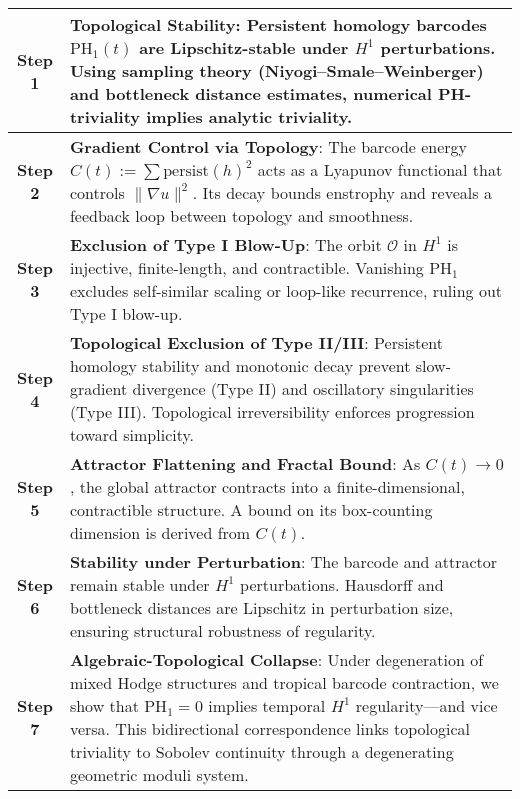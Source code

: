 \documentclass[11pt]{article}
\theoremstyle{definition}
\begin{document}
\begin{center}
\renewcommand{\arraystretch}{1.4}
\begin{tabular}{|c|p{12.5cm}|}
\hline
\textbf{Step 1} & \textbf{Topological Stability}: Persistent homology barcodes $\mathrm{PH}_1(t)$ are Lipschitz-stable under $H^1$ perturbations. Using sampling theory (Niyogi--Smale--Weinberger) and bottleneck distance estimates, numerical PH-triviality implies analytic triviality. \\
\hline
\textbf{Step 2} & \textbf{Gradient Control via Topology}: The barcode energy $C(t) := \sum \mathrm{persist}(h)^2$ acts as a Lyapunov functional that controls $\|\nabla u\|^2$. Its decay bounds enstrophy and reveals a feedback loop between topology and smoothness. \\
\hline
\textbf{Step 3} & \textbf{Exclusion of Type I Blow-Up}: The orbit $\mathcal{O}$ in $H^1$ is injective, finite-length, and contractible. Vanishing $\mathrm{PH}_1$ excludes self-similar scaling or loop-like recurrence, ruling out Type I blow-up. \\
\hline
\textbf{Step 4} & \textbf{Topological Exclusion of Type II/III}: Persistent homology stability and monotonic decay prevent slow-gradient divergence (Type II) and oscillatory singularities (Type III). Topological irreversibility enforces progression toward simplicity. \\
\hline
\textbf{Step 5} & \textbf{Attractor Flattening and Fractal Bound}: As $C(t) \to 0$, the global attractor contracts into a finite-dimensional, contractible structure. A bound on its box-counting dimension is derived from $C(t)$. \\
\hline
\textbf{Step 6} & \textbf{Stability under Perturbation}: The barcode and attractor remain stable under $H^1$ perturbations. Hausdorff and bottleneck distances are Lipschitz in perturbation size, ensuring structural robustness of regularity. \\
\hline
\textbf{Step 7} & \textbf{Algebraic-Topological Collapse}: Under degeneration of mixed Hodge structures and tropical barcode contraction, we show that $\mathrm{PH}_1 = 0$ implies temporal $H^1$ regularity—and vice versa. This bidirectional correspondence links topological triviality to Sobolev continuity through a degenerating geometric moduli system. \\
\hline
\end{tabular}
\end{center}


\end{document}
